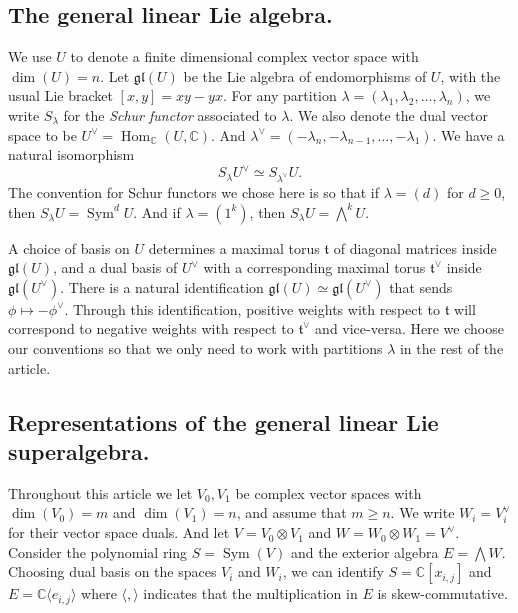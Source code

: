 \documentclass[12pt]{amsart}
\theoremstyle{definition}
\theoremstyle{remark}
\newcommand{\bbC}{\mathbb{C}}
\newcommand{\ft}{\mathfrak{t}}
\newcommand{\gl}{\mathfrak{gl}}
\newcommand{\Hom}{\operatorname{Hom}}
\newcommand{\Sym}{\operatorname{Sym}}
\numberwithin{equation}{section}
\begin{document}
\subsection{The general linear Lie algebra.} \label{subsection:LieAlgebra}
We use $U$ to denote a finite dimensional complex vector space with $\dim (U) = n$. Let $\gl(U)$ be the Lie algebra of endomorphisms of $U$, with the usual Lie bracket $[x,y] = xy-yx$. For any partition $\lambda = (\lambda_1,\lambda_2,\ldots,\lambda_n)$, we write $S_{\lambda}$ for the \emph{Schur functor} associated to $\lambda$. We also denote the dual vector space to be $U^{\vee} = \Hom_{\bbC}(U,\bbC)$. And $\lambda^{\vee} = (-\lambda_n,-\lambda_{n-1},\ldots,-\lambda_1)$. We have a natural isomorphism
\begin{equation} \label{SchurFunctorDualVectorSpace}
    S_{\lambda} U^{\vee} \simeq S_{\lambda^{\vee}} U.
\end{equation}
The convention for Schur functors we chose here is so that if $\lambda = (d)$ for $d \geq 0$, then $S_{\lambda} U = \Sym^d U$. And if $\lambda = (1^k)$, then $S_{\lambda} U = \bigwedge^k U$.

A choice of basis on $U$ determines a maximal torus $\ft$ of diagonal matrices inside $\gl(U)$, and a dual basis of $U^{\vee}$ with a corresponding maximal torus $\ft^{\vee}$ inside $\gl(U^{\vee})$. There is a natural identification $\gl(U) \simeq \gl(U^{\vee})$ that sends $\phi \mapsto - \phi^{\vee}$. Through this identification, positive weights with respect to $\ft$ will correspond to negative weights with respect to $\ft^{\vee}$ and vice-versa. Here we choose our conventions so that we only need to work with partitions $\lambda$ in the rest of the article.

\subsection{Representations of the general linear Lie superalgebra.} \label{subsection:LieSuperalgebra}
Throughout this article we let $V_0,V_1$ be complex vector spaces with $\dim(V_0) = m$ and $\dim(V_1) = n$, and assume that $m \geq n$. We write $W_i = V_i^{\vee}$ for their vector space duals. And let $V = V_0 \otimes V_1$ and $W = W_0 \otimes W_1 = V^{\vee}$. Consider the polynomial ring $S = \Sym(V)$ and the exterior algebra $E = \bigwedge W$. Choosing dual basis on the spaces $V_i$ and $W_i$, we can identify $S = \bbC[x_{i,j}]$ and $E = \bbC \langle e_{i,j} \rangle$ where $\langle , \rangle$ indicates that the multiplication in $E$ is skew-commutative.
\end{document}
